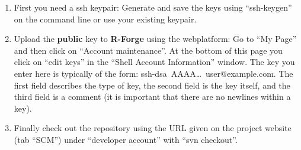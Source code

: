 \documentclass[a4paper]{article}
\begin{document}
\begin{enumerate}
\item First you need a ssh keypair: Generate and save the keys
  using ``ssh-keygen'' on the command line or use your existing keypair.  
\item Upload the \textbf{public} key to \textbf{R-Forge} using the
  webplatform: Go to
  ``My Page'' and then click on ``Account maintenance''. At the bottom
  of this page you click on ``edit keys'' in the ``Shell Account
  Information'' window. The key you enter here is typically of the
  form: ssh-dsa~AAAA\ldots~user@example.com. The first field
  describes the type of key, the second field is the key itself, and
  the third field is a comment (it is important that there are no
  newlines within a key).
\item Finally check out the repository using the URL given on the
  project website (tab ``SCM'') under ``developer account'' with
  ``svn checkout''.
\end{enumerate}



\end{document}
